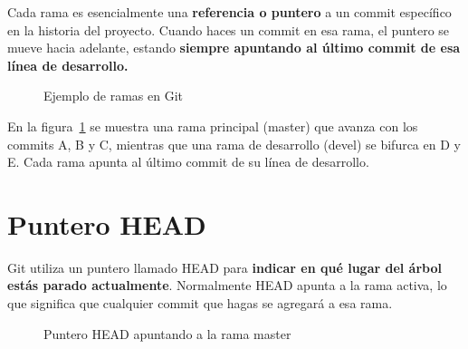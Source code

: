 \documentclass[a4paper,12pt]{report}
\begin{document}
Cada rama es esencialmente una \textbf{referencia o puntero} a un commit específico en la historia del proyecto.
Cuando haces un commit en esa rama, el puntero se mueve hacia adelante, estando \textbf{siempre apuntando al
último commit de esa línea de desarrollo.}

\begin{figure}[h]
  \centering
  \caption{Ejemplo de ramas en Git}
  \label{fig:git_branches}
\end{figure}

En la figura~\ref{fig:git_branches} se muestra una rama principal (master) que avanza con los commits
A, B y C, mientras que una rama de desarrollo (devel) se bifurca en D y E. Cada rama apunta al último
commit de su línea de desarrollo.

\section{Puntero HEAD}
Git utiliza un puntero llamado HEAD para \textbf{indicar en qué lugar del árbol estás parado actualmente}.
Normalmente HEAD apunta a la rama activa, lo que significa que cualquier commit que hagas se agregará a esa rama.

\begin{figure}[h]
  \centering
  \caption{Puntero HEAD apuntando a la rama master}
  \label{fig:git_head_master}
\end{figure}
\end{document}

